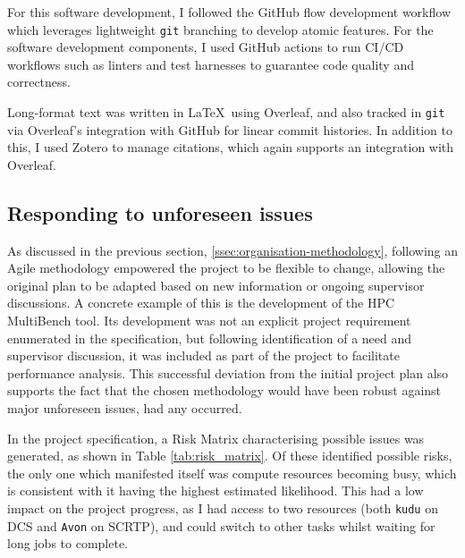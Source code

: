 For this software development, I followed the GitHub flow development workflow \cite{GitHubFlow} which leverages lightweight \texttt{git} branching to develop atomic features. For the software development components, I used GitHub actions to run CI/CD workflows \cite{WhatCICD} such as linters and test harnesses to guarantee code quality and correctness.

Long-format text was written in \LaTeX\ using Overleaf\cite{OverleafOnlineLaTeX}, and also tracked in \texttt{git} via Overleaf's integration with GitHub for linear commit histories. In addition to this, I used Zotero \cite{ZoteroYourPersonal} to manage citations, which again supports an integration with Overleaf.


\subsection{Responding to unforeseen issues}
\label{ssec:organisation-unforeseen-issues}

As discussed in the previous section, \ref{ssec:organisation-methodology}, following an Agile methodology empowered the project to be flexible to change, allowing the original plan to be adapted based on new information or ongoing supervisor discussions. A concrete example of this is the development of the HPC MultiBench tool. Its development was not an explicit project requirement enumerated in the specification, but following identification of a need and supervisor discussion, it was included as part of the project to facilitate performance analysis. This successful deviation from the initial project plan also supports the fact that the chosen methodology would have been robust against major unforeseen issues, had any occurred.

In the project specification, a Risk Matrix characterising possible issues was generated, as shown in Table \ref{tab:risk_matrix}.
Of these identified possible risks, the only one which manifested itself was compute resources becoming busy, which is consistent with it having the highest estimated likelihood. This had a low impact on the project progress, as I had access to two resources (both \texttt{kudu} on DCS and \texttt{Avon} on SCRTP), and could switch to other tasks whilst waiting for long jobs to complete.


